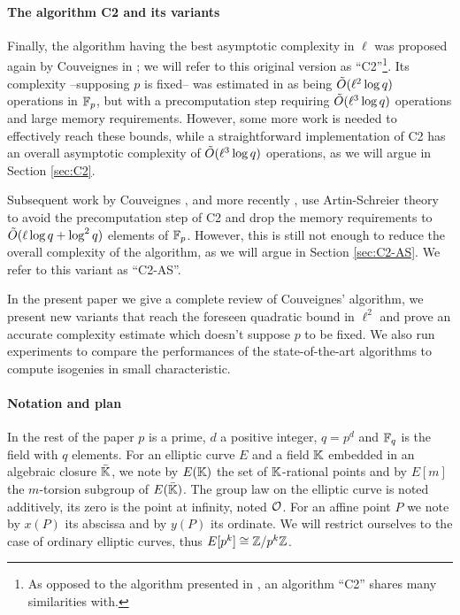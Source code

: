 \paragraph{The algorithm C2 and its variants}
Finally, the algorithm having the best asymptotic complexity in $\ell$
was proposed again by Couveignes in \cite{Cou96}; we will refer to
this original version as ``C2''\footnote{As opposed to the algorithm
  presented in \cite{Cou94}, an algorithm ``C2'' shares many
  similarities with.}. Its complexity --supposing $p$ is fixed-- was
estimated in \cite{Cou96} as being $\tilde{O}(\ell^2\log q)$ operations
in $\mathbb{F}_p$, but with a precomputation step requiring $\tilde{O}(\ell^3\log
q)$ operations and large memory requirements. However, some more work
is needed to effectively reach these bounds, while a straightforward
implementation of C2 has an overall asymptotic complexity of
$\tilde{O}(\ell^3\log q)$ operations, as we will argue in Section
\ref{sec:C2}.

Subsequent work by Couveignes \cite{Cou00}, and more recently
\cite{DFS09}, use Artin-Schreier theory to avoid the precomputation
step of C2 and drop the memory requirements to $\tilde{O}(\ell\log q +
\log^2 q)$ elements of $\mathbb{F}_p$. However, this is still not enough to
reduce the overall complexity of the algorithm, as we will argue in
Section \ref{sec:C2-AS}. We refer to this variant as ``C2-AS''.

In the present paper we give a complete review of Couveignes'
algorithm, we present new variants that reach the foreseen quadratic
bound in $\ell^2$ and prove an accurate complexity estimate which
doesn't suppose $p$ to be fixed. We also run experiments to compare
the performances of the state-of-the-art algorithms to compute
isogenies in small characteristic.

\paragraph{Notation and plan}
In the rest of the paper $p$ is a prime, $d$ a positive integer,
$q=p^d$ and $\mathbb{F}_q$ is the field with $q$ elements. For an elliptic
curve $E$ and a field $\mathbb{K}$ embedded in an algebraic closure
$\bar{\mathbb{K}}$, we note by $E(\mathbb{K})$ the set of $\mathbb{K}$-rational points and by
$E[m]$ the $m$-torsion subgroup of $E(\bar{\mathbb{K}})$. The group law on
the elliptic curve is noted additively, its zero is the point at
infinity, noted $\mathcal{O}$. For an affine point $P$ we note by $x(P)$ its
abscissa and by $y(P)$ its ordinate. We will restrict ourselves to the
case of ordinary elliptic curves, thus $E[p^k]\cong\mathbb{Z}/p^k\mathbb{Z}$.

